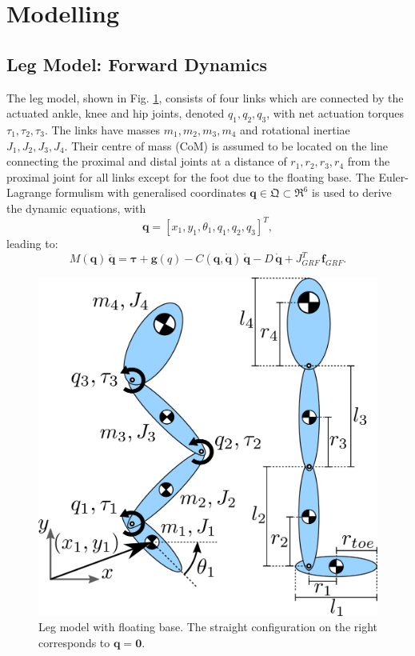\documentclass[letterpaper, 10 pt, conference]{ieeeconf}  %
\begin{document}
\section{Modelling} 
\label{sec:modelling}

\subsection{Leg Model: Forward Dynamics} 
The leg model, shown in Fig. \ref{fig:Leg_3DoF_model}, consists of four links which are connected by the actuated ankle, knee and hip joints, denoted $q_1,q_2,q_3$, with net actuation torques $\tau_1,\tau_2,\tau_3$. The links have masses $m_1,m_2,m_3,m_4$ and rotational inertiae $J_1,J_2,J_3,J_4$. Their centre of mass (CoM) is assumed to be located on the line connecting the proximal and distal joints at a distance of $r_1,r_2,r_3,r_4$ from the proximal joint for all links except for the foot due to the floating base. %
The Euler-Lagrange formulism with generalised coordinates $\mathbf{q} \in \mathfrak{Q} \subset \mathfrak{R}^{6}$ is used to derive the dynamic equations, with
\begin{equation}
	\mathbf{q} = [x_1,y_1,\theta_1,q_1,q_2,q_3]^T,
	\label{eq:q}
\end{equation}
leading to:
\begin{equation}
	M(\mathbf{q}) \, \mathbf{\ddot q} = \mathbf{\boldsymbol{\tau}} + \mathbf{g}(q) - C(\mathbf{q, \dot q}) \, \mathbf{\dot q} - D \, \mathbf{\dot q} + J_{GRF}^T \, \mathbf{f}_{GRF}.
\label{eq:fwddyn}
\end{equation}

\begin{figure}[ht]
	\centering
	\includegraphics[width=0.6\linewidth]{Leg_3DoF_model}
	\caption{Leg model with floating base. The straight configuration on
		the right corresponds to $\mathbf{q} = \mathbf{0}$.}
	\label{fig:Leg_3DoF_model}
\end{figure}
\end{document}

